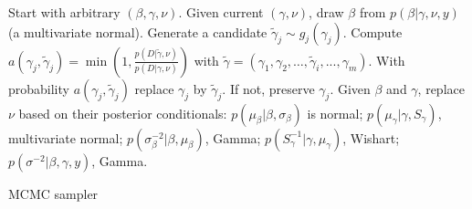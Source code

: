 \begin{algorithm}[!ht]
\begin{algorithmic}[1]
\State Start with arbitrary $(\beta , \gamma ,\nu )$.
 \State Given current $(\gamma,\nu)$, draw  
    $\beta$ from  
    $p(\beta|\gamma,\nu,y)$ (a multivariate normal).
    \State Generate a candidate $\tilde\gamma_j \sim g_j(\gamma_j)$.
    \State Compute 
    $
       a(\gamma_j,\tilde\gamma_j) =
       \min\left(1,\frac{p(D |\tilde\gamma,\nu)}
                       {p(D |\gamma,\nu)}\right)
    $
    with $\tilde\gamma = (\gamma_1,\gamma_2,\ldots,\tilde\gamma_i, ...,\gamma_m)$.
    \State With probability $a(\gamma_j,\tilde\gamma_j)$ replace $\gamma_j$
    by $\tilde\gamma_j$. If not, preserve $\gamma_j$.
    \EndFor
    \State Given $\beta$ and $\gamma$, replace $\nu$
        based on their posterior conditionals:
 $p(\mu_\beta|\beta,\sigma_\beta)$ is normal;
 $p(\mu_\gamma|\gamma,S_\gamma)$, multivariate normal;
 $p(\sigma_\beta^{-2}|\beta,\mu_\beta)$, Gamma; 
    $p(S_\gamma^{-1}|\gamma,\mu_\gamma)$, Wishart; 
    $p(\sigma^{-2}|\beta,\gamma,y)$, Gamma.
    
\EndWhile
\end{algorithmic}
 \caption{MCMC sampler}\label{alg:mcmc}
\end{algorithm}



